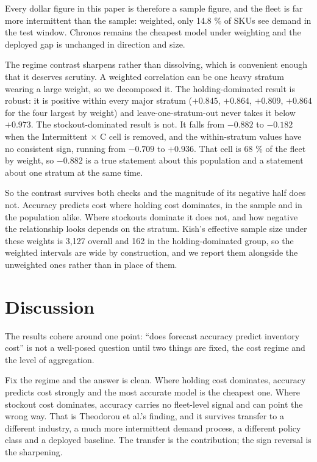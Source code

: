 \documentclass[11pt]{article}
\begin{document}
\noindent Every dollar figure in this paper is therefore a sample figure, and
the fleet is far more intermittent than the sample: weighted, only 14.8 \% of
SKUs see demand in the test window. Chronos remains the cheapest model under
weighting and the deployed gap is unchanged in direction and size.

The regime contrast sharpens rather than dissolving, which is convenient enough
that it deserves scrutiny. A weighted correlation can be one heavy stratum
wearing a large weight, so we decomposed it. The holding-dominated result is
robust: it is positive within every major stratum ($+0.845$, $+0.864$,
$+0.809$, $+0.864$ for the four largest by weight) and leave-one-stratum-out
never takes it below $+0.973$. The stockout-dominated result is not. It falls
from $-0.882$ to $-0.182$ when the Intermittent $\times$ C cell is removed, and
the within-stratum values have no consistent sign, running from $-0.709$ to
$+0.936$. That cell is 68 \% of the fleet by weight, so $-0.882$ is a true
statement about this population and a statement about one stratum at the same
time.

So the contrast survives both checks and the magnitude of its negative half
does not. Accuracy predicts cost where holding cost dominates, in the sample and
in the population alike. Where stockouts dominate it does not, and how negative
the relationship looks depends on the stratum. Kish's effective sample size
under these weights is 3{,}127 overall
and 162 in the holding-dominated group, so the weighted intervals are wide by
construction, and we report them alongside the unweighted ones rather than in
place of them.

\section{Discussion}

The results cohere around one point: ``does forecast accuracy predict inventory
cost'' is not a well-posed question until two things are fixed, the cost regime
and the level of aggregation.

Fix the regime and the answer is clean. Where holding cost dominates, accuracy
predicts cost strongly and the most accurate model is the cheapest one. Where
stockout cost dominates, accuracy carries no fleet-level signal and can point
the wrong way. That is Theodorou et al.'s finding, and it survives transfer to
a different industry, a much more intermittent demand process, a different
policy class and a deployed baseline. The transfer is the contribution; the
sign reversal is the sharpening.
\end{document}
